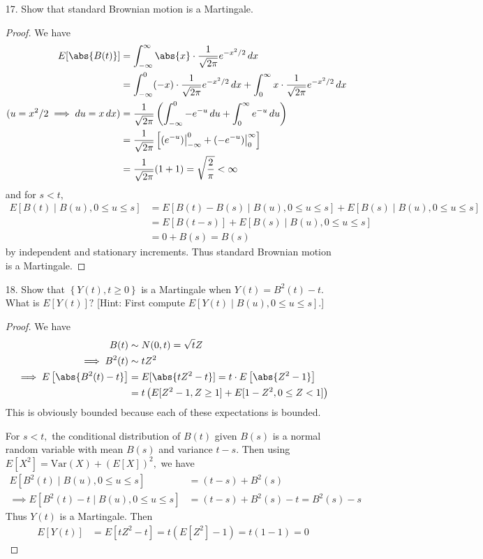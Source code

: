 \documentclass{article}
\newcommand{\var}{\mathrm{Var}}
\begin{document}
\begin{itemize}
		\newpage
	\item[17.] Show that standard Brownian motion is a Martingale.
		\begin{proof}
			We have
			\begin{align*}
				E[\abs{B(t)}] &= \int_{-\infty}^\infty \abs{x}\cdot \frac{1}{\sqrt{2\pi}} e^{-x^2/2}\, dx \\
				&= \int_{-\infty}^0 (-x) \cdot \frac{1}{\sqrt{2\pi}}e^{-x^2/2}\, dx + \int_0^\infty x\cdot \frac{1}{\sqrt{2\pi}} e^{-x^2/2}\, dx \\
				(u = x^2/2\implies du=x\, dx) &= \frac{1}{\sqrt{2\pi}}\left(\int_{-\infty}^0 -e^{-u}\, du + \int_0^\infty e^{-u}\, du\right) \\
				&= \frac{1}{\sqrt{2\pi}} \left[(e^{-u})\big\vert^0_{-\infty} + (-e^{-u})\big\vert^\infty_0\right] \\
				&= \frac{1}{\sqrt{2\pi}}(1 + 1) = \sqrt{\frac{2}{\pi}} < \infty
			\end{align*}
			and for $s<t,$
			\begin{align*}
				E[B(t)\mid B(u), 0\le u\le s] &= E[B(t)-B(s)\mid B(u), 0\le u\le s] + E[B(s)\mid B(u), 0\le u\le s] \\
				&= E[B(t-s)] + E[B(s)\mid B(u), 0\le u\le s] \\
				&= 0 + B(s) = B(s)
			\end{align*}
			by independent and stationary increments. Thus standard Brownian motion is a Martingale.
		\end{proof}

	\item[18.] Show that $\left\{ Y(t), t\ge 0 \right\}$ is a Martingale when $Y(t)=B^2(t)-t.$ What is $E[Y(t)]?$ [Hint: First compute $E[Y(t)\mid B(u), 0\le u\le s].$]
		\begin{proof}
			We have
			\begin{align*}
				B(t)&\sim N(0, t) = \sqrt{t}Z \\
				\implies B^2(t) &\sim tZ^2 \\
				\implies E\left[ \abs{B^2(t)-t} \right] &= E[\abs{tZ^2-t}] = t \cdot E\left[ \abs{Z^2-1} \right]\\
				&= t\left( E[Z^2-1, Z\ge 1] + E[1-Z^2, 0\le Z < 1] \right)
			\end{align*}
			This is obviously bounded because each of these expectations is bounded.

			For $s<t,$ the conditional distribution of $B(t)$ given $B(s)$ is a normal random variable with mean $B(s)$ and variance $t-s.$ Then using $E[X^2]=\var(X) + (E[X])^2,$ we have
			\begin{align*}
				E[B^2(t)\mid B(u), 0\le u\le s] &= (t-s) + B^2(s) \\
				\implies  E[B^2(t) - t\mid B(u), 0\le u\le s] &= (t-s)+B^2(s)-t = B^2(s)-s
			\end{align*}
			Thus $Y(t)$ is a Martingale. Then
			\begin{align*}
				E[Y(t)] &= E[tZ^2-t] = t(E[Z^2] - 1) = t(1-1)=0
			\end{align*}
		\end{proof}


\end{itemize}
\end{document}

